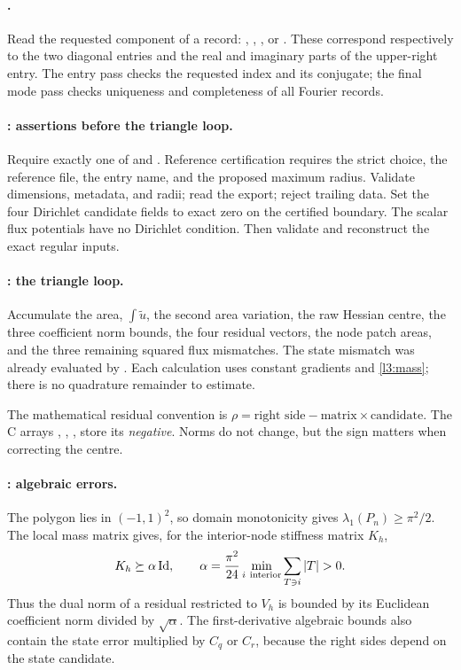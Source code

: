 \paragraph{.}
Read the requested component of a  record: ,
, , or . These correspond respectively
to the two diagonal entries and the real and imaginary parts of the
upper-right entry. The entry pass checks the requested index and its
conjugate; the final mode pass checks uniqueness and completeness of all
Fourier records.

\paragraph{: assertions before the triangle loop.}
Require exactly one of  and
. Reference certification requires the strict
choice, the reference file, the entry name, and the proposed maximum
radius. Validate dimensions, metadata, and radii; read the export; reject
trailing data. Set the four Dirichlet candidate fields to exact zero on
the certified boundary. The scalar flux potentials have no Dirichlet
condition. Then validate and reconstruct the exact regular inputs.

\paragraph{: the triangle loop.}
Accumulate the area, $\int\widetilde u$, the second area variation, the
raw Hessian centre, the three coefficient norm bounds, the four residual
vectors, the node patch areas, and the three remaining squared flux
mismatches. The state mismatch was already evaluated by
. Each calculation uses constant gradients and
\eqref{l3:mass}; there is no quadrature remainder to estimate.

The mathematical residual convention is
$\rho=\text{right side}-\text{matrix}\times\text{candidate}$.
The C arrays , , , 
store its \emph{negative}. Norms do not change, but the sign matters when
correcting the centre.

\paragraph{: algebraic errors.}
The polygon lies in $(-1,1)^2$, so domain monotonicity gives
$\lambda_1(P_n)\geq\pi^2/2$. The local mass matrix gives, for the
interior-node stiffness matrix $K_h$,
\[
 K_h\succeq\alpha\Id,\qquad
 \alpha=\frac{\pi^2}{24}
       \min_{i\ \mathrm{interior}}\sum_{T\ni i}|T|>0.
\]
Thus the dual norm of a residual restricted to $V_h$ is bounded by its
Euclidean coefficient norm divided by $\sqrt\alpha$. The first-derivative
algebraic bounds also contain the state error multiplied by $C_q$ or
$C_r$, because the right sides depend on the state candidate.

